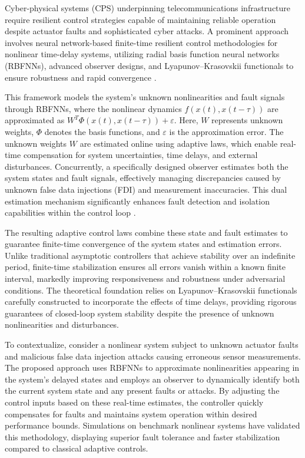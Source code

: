 \documentclass[sigconf]{acmart}
\begin{document}
Cyber-physical systems (CPS) underpinning telecommunications infrastructure require resilient control strategies capable of maintaining reliable operation despite actuator faults and sophisticated cyber attacks. A prominent approach involves neural network-based finite-time resilient control methodologies for nonlinear time-delay systems, utilizing radial basis function neural networks (RBFNNs), advanced observer designs, and Lyapunov--Krasovskii functionals to ensure robustness and rapid convergence \cite{ref46}.

This framework models the system’s unknown nonlinearities and fault signals through RBFNNs, where the nonlinear dynamics \( f(x(t), x(t-\tau)) \) are approximated as \( W^{T} \Phi(x(t), x(t-\tau)) + \varepsilon \). Here, \( W \) represents unknown weights, \( \Phi \) denotes the basis functions, and \( \varepsilon \) is the approximation error. The unknown weights \( W \) are estimated online using adaptive laws, which enable real-time compensation for system uncertainties, time delays, and external disturbances. Concurrently, a specifically designed observer estimates both the system states and fault signals, effectively managing discrepancies caused by unknown false data injections (FDI) and measurement inaccuracies. This dual estimation mechanism significantly enhances fault detection and isolation capabilities within the control loop \cite{ref46}.

The resulting adaptive control laws combine these state and fault estimates to guarantee finite-time convergence of the system states and estimation errors. Unlike traditional asymptotic controllers that achieve stability over an indefinite period, finite-time stabilization ensures all errors vanish within a known finite interval, markedly improving responsiveness and robustness under adversarial conditions. The theoretical foundation relies on Lyapunov--Krasovskii functionals carefully constructed to incorporate the effects of time delays, providing rigorous guarantees of closed-loop system stability despite the presence of unknown nonlinearities and disturbances.

To contextualize, consider a nonlinear system subject to unknown actuator faults and malicious false data injection attacks causing erroneous sensor measurements. The proposed approach uses RBFNNs to approximate nonlinearities appearing in the system's delayed states and employs an observer to dynamically identify both the current system state and any present faults or attacks. By adjusting the control inputs based on these real-time estimates, the controller quickly compensates for faults and maintains system operation within desired performance bounds. Simulations on benchmark nonlinear systems have validated this methodology, displaying superior fault tolerance and faster stabilization compared to classical adaptive controls.
\end{document}
